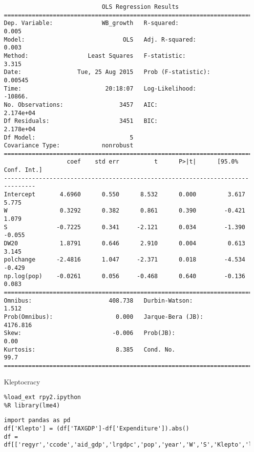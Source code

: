 \documentclass[12pt,fleqn]{article}\usepackage{common}
\begin{document}
\begin{verbatim}
                            OLS Regression Results                            
==============================================================================
Dep. Variable:              WB_growth   R-squared:                       0.005
Model:                            OLS   Adj. R-squared:                  0.003
Method:                 Least Squares   F-statistic:                     3.315
Date:                Tue, 25 Aug 2015   Prob (F-statistic):            0.00545
Time:                        20:18:07   Log-Likelihood:                -10866.
No. Observations:                3457   AIC:                         2.174e+04
Df Residuals:                    3451   BIC:                         2.178e+04
Df Model:                           5                                         
Covariance Type:            nonrobust                                         
===============================================================================
                  coef    std err          t      P>|t|      [95.0% Conf. Int.]
-------------------------------------------------------------------------------
Intercept       4.6960      0.550      8.532      0.000         3.617     5.775
W               0.3292      0.382      0.861      0.390        -0.421     1.079
S              -0.7225      0.341     -2.121      0.034        -1.390    -0.055
DW20            1.8791      0.646      2.910      0.004         0.613     3.145
polchange      -2.4816      1.047     -2.371      0.018        -4.534    -0.429
np.log(pop)    -0.0261      0.056     -0.468      0.640        -0.136     0.083
==============================================================================
Omnibus:                      408.738   Durbin-Watson:                   1.512
Prob(Omnibus):                  0.000   Jarque-Bera (JB):             4176.816
Skew:                          -0.006   Prob(JB):                         0.00
Kurtosis:                       8.385   Cond. No.                         99.7
==============================================================================
\end{verbatim}


Kleptocracy

\begin{verbatim}
%load_ext rpy2.ipython
%R library(lme4)
\end{verbatim}

\begin{verbatim}
import pandas as pd
df['Klepto'] = (df['TAXGDP']-df['Expenditure']).abs()
df = df[['regyr','ccode','aid_gdp','lrgdpc','pop','year','W','S','Klepto','laglrgdpc']]
\end{verbatim}
\end{document}
